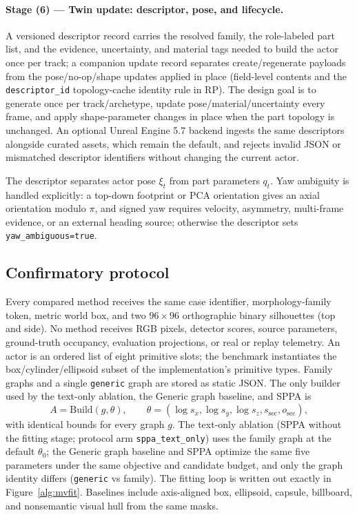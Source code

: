 \documentclass[11pt,a4paper]{article}
\begin{document}
\paragraph{Stage (6) --- Twin update: descriptor, pose, and lifecycle.}
\label{sec:implementation}
{\sloppy
A versioned descriptor record carries the resolved family, the role-labeled
part list, and the evidence, uncertainty, and material tags needed to build
the actor once per track; a companion update record separates
create/regenerate payloads from the pose/no-op/shape updates applied in place
(field-level contents and the \texttt{descriptor\_id}
topology-cache identity rule in RP). The
design goal is to generate once per track/archetype, update
pose/material/uncertainty every frame, and apply shape-parameter changes in
place when the part topology is unchanged. An optional Unreal Engine 5.7
backend ingests the same descriptors alongside curated assets, which remain
the default, and rejects invalid JSON or mismatched descriptor identifiers
without changing the current actor.
\par}
The descriptor separates actor pose \(\xi_t\) from part parameters \(q_t\). Yaw
ambiguity is handled explicitly: a top-down footprint or PCA orientation gives
an axial orientation modulo \(\pi\), and signed yaw requires velocity,
asymmetry, multi-frame evidence, or an external heading source; otherwise the
descriptor sets \texttt{yaw\_ambiguous=true}.

\subsection{Confirmatory protocol}
\label{sec:mvfit}

Every compared method receives the same case identifier, morphology-family
token, metric world box, and two \(96\times 96\) orthographic binary
silhouettes (top and side). No method receives RGB pixels, detector scores,
source parameters, ground-truth occupancy, evaluation projections, or real or
replay telemetry. An actor is an ordered list of eight primitive slots; the benchmark
instantiates the box/cylinder/ellipsoid subset of the implementation's
primitive types. Family graphs and a single \texttt{generic} graph are
stored as static JSON. The only builder used by the text-only ablation, the
Generic graph baseline, and SPPA is
\begin{equation}
A = \mathrm{Build}(g,\theta),\qquad
\theta=(\log s_x,\log s_y,\log s_z,s_{\mathrm{sec}},o_{\mathrm{sec}}),
\end{equation}
with identical bounds for every graph \(g\). The text-only ablation (SPPA
without the fitting stage; protocol arm \texttt{sppa\_text\_only}) uses the family
graph at the default \(\theta_0\); the Generic graph baseline and SPPA optimize the
same five parameters under the same objective and candidate budget, and only
the graph identity differs (\texttt{generic} vs family). The fitting loop is
written out exactly in Figure~\ref{alg:mvfit}. Baselines include
axis-aligned box, ellipsoid, capsule, billboard, and nonsemantic visual hull
from the same masks.
\end{document}
